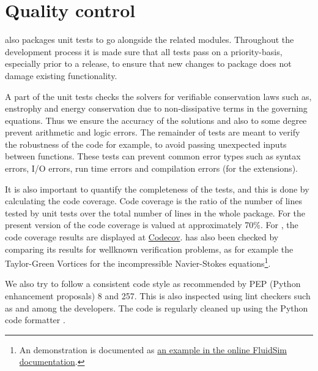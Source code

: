 \section{Quality control}


 also packages unit tests to go alongside the related
modules. Throughout the development process it is made sure that all tests pass
on a priority-basis, especially prior to a release, to ensure that new changes
to package does not damage existing functionality.

A part of the unit tests checks the solvers for verifiable conservation laws
such as, enstrophy and energy conservation due to non-dissipative terms in the
governing equations. Thus we ensure the accuracy of the solutions and also to
some degree prevent arithmetic and logic errors. The remainder of tests are
meant to verify the robustness of the code for example, to avoid passing
unexpected inputs between functions. These tests can prevent common error
types such as syntax errors, I/O errors, run time errors and compilation errors
(for the extensions).

It is also important to quantify the completeness of the tests, and this
is done by calculating the code coverage. Code coverage is the ratio of the
number of lines tested by unit tests over the total number of lines in the whole
package. For the present version of  the code coverage is
valued at approximately 70\%.
%
For , the code coverage results are displayed at
\href{https://codecov.io/bb/fluiddyn/fluidsim}{Codecov}.
%
 has also been checked by comparing its results for wellknown
verification problems, as for example the Taylor-Green Vortices for the
incompressible Navier-Stokes equations\footnote{An demonstration is documented
  as \href{https://fluidsim.readthedocs.io/en/latest/examples.html}{an example
  in the online FluidSim documentation}.
}.

We also try to follow a consistent code style as recommended by PEP (Python
enhancement proposals) 8 and 257. This is also inspected using lint
checkers such as  and  among the
developers. The code is regularly cleaned up using the Python code formatter
.

